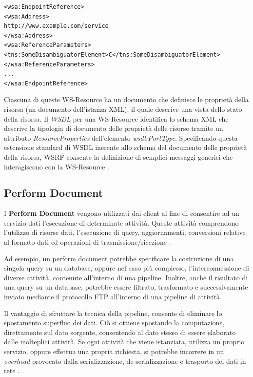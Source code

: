 \documentclass[11pt]{article}
\begin{document}
\begin{lstlisting}
<wsa:EndpointReference>
<wsa:Address>
http://www.example.com/service
</wsa:Address>
<wsa:ReferenceParameters>
<tns:SomeDisambiguatorElement>C</tns:SomeDisambiguatorElement>
</wsa:ReferenceParameters>
...
</wsa:EndpointReference>
\end{lstlisting}

Ciascuna di queste WS-Resource ha un documento che definisce le proprietà della risorsa (un documento dell'istanza XML), il quale descrive una vista dello stato della risorsa. Il \emph{WSDL} per una WS-Resource identifica lo schema XML che descrive la tipologia di documento delle proprietà delle risorse tramite un attributo \emph{ResourceProperties} dell'elemento \emph{wsdl:PortType}. Specificando questa estensione standard di WSDL inerente allo schema del documento delle proprietà della risorsa, WSRF consente la definizione di semplici messaggi generici che interagiscono con la WS-Resource \cite{ogsadai}.

\subsection {Perform Document}
I \textbf{Perform Document} vengono utilizzati dai client al fine di consentire ad un servizio dati l'esecuzione di determinate attività. Queste attività comprendono l'utilizzo di risorse dati, l'esecuzione di query, aggiornamenti, conversioni relative al formato dati ed operazioni di trasmissione/ricezione \cite{ogsadai}. 

Ad esempio, un perform document potrebbe specificare la costruzione di una singola query su un database, oppure nel caso più complesso, l'interconnessione di diverse attività, contenute all'interno di una pipeline. Inoltre, anche il risultato di una query su un database, potrebbe essere filtrato, trasformato e successivamente inviato mediante il protocollo FTP all'interno di una pipeline di attività \cite{ogsadai}.

Il vantaggio di sfruttare la tecnica della pipeline, consente di eliminare lo spostamento superfluo dei dati. Ciò si ottiene spostando la computazione, direttamente sul dato sorgente, consentendo al dato stesso di essere elaborato dalle molteplici attività. Se ogni attività che viene istanziata, utilizza un proprio servizio, oppure effettua una propria richiesta, si potrebbe incorrere in un \emph{overhead} provocato dalla serializzazione, de-serializzazione e trasporto dei dati in rete \cite{ogsadai}.
\end{document}
